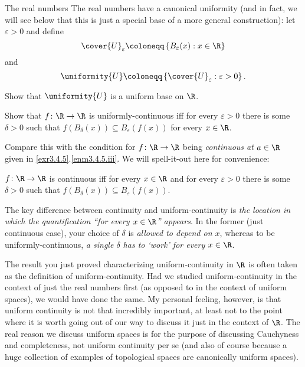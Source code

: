 \begin{exm}{The real numbers}{}
The real numbers have a canonical uniformity (and in fact, we will see below that this is just a special base of a more general construction):  let $\varepsilon >0$ and define
\begin{equation}
\cover{U}_{\varepsilon}\coloneqq \left\{ B_{\varepsilon}(x):x\in \R \right\}
\end{equation}
 and
\begin{equation}
\uniformity{U}\coloneqq \left\{ \cover{U}_{\varepsilon}:\varepsilon >0\right\} .
\end{equation}
\begin{exr}[breakable=false]{}{}
Show that $\uniformity{U}$ is a uniform base on $\R$.
\end{exr}
\begin{exr}[breakable=false]{}{}
Show that $f\colon \R \rightarrow \R$ is uniformly-continuous iff for every $\varepsilon >0$ there is some $\delta >0$ such that $f(B_{\delta}(x))\subseteq B_{\varepsilon}(f(x))$ for every $x\in \R$.
\begin{rmk}
Compare this with the condition for $f\colon \R \rightarrow \R$ being \emph{continuous at $a\in \R$} given in \cref{exr3.4.5}.\cref{enm3.4.5.iii}.  We will spell-it-out here for convenience:
\begin{textequation}
$f\colon \R \rightarrow \R$ is continuous iff for every $x\in \R$ and for every $\varepsilon >0$ there is some $\delta >0$ such that $f(B_{\delta}(x))\subseteq B_{\varepsilon}(f(x))$.
\end{textequation}
The key difference between continuity and uniform-continuity is \emph{the location in which the quantification ``for every $x\in \R$'' appears}.  In the former (just continuous case), your choice of $\delta$ is \emph{allowed to depend on $x$}, whereas to be uniformly-continuous, \emph{a single $\delta$ has to `work' for every $x\in \R$}.
\end{rmk}
\begin{rmk}
The result you just proved characterizing uniform-continuity in $\R$ is often taken as the definition of uniform-continuity.  Had we studied uniform-continuity in the context of just the real numbers first (as opposed to in the context of uniform spaces), we would have done the same.  My personal feeling, however, is that uniform continuity is not that incredibly important, at least not to the point where it is worth going out of our way to discuss it just in the context of $\R$.  The real reason we discuss uniform spaces is for the purpose of discussing Cauchyness and completeness, not uniform continuity per se (and also of course because a huge collection of examples of topological spaces are canonically uniform spaces).
\end{rmk}
\end{exr}
\end{exm}

